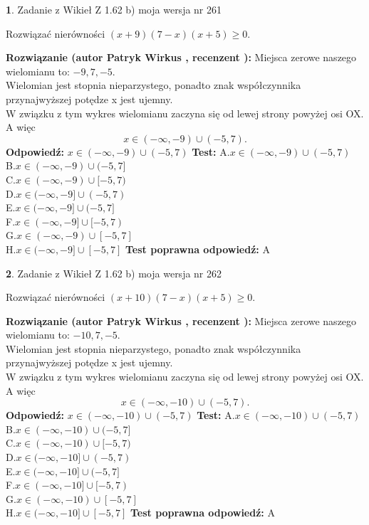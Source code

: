 \documentclass[12pt, a4paper]{article}
\theoremstyle{definition} %
\newtheorem{zad}{}
\newcommand{\zadStart}[1]{\begin{zad}#1\newline}
\newcommand{\zadStop}{\end{zad}}
\newcommand{\rozwStart}[2]{\noindent \textbf{Rozwiązanie (autor #1 , recenzent #2): }\newline}
\newcommand{\rozwStop}{\newline}
\newcommand{\odpStart}{\noindent \textbf{Odpowiedź:}\newline}
\newcommand{\odpStop}{\newline}
\newcommand{\testStart}{\noindent \textbf{Test:}\newline}
\newcommand{\testStop}{\newline}
\newcommand{\kluczStart}{\noindent \textbf{Test poprawna odpowiedź:}\newline}
\newcommand{\kluczStop}{\newline}
\begin{document}
\zadStart{Zadanie z Wikieł Z 1.62 b) moja wersja nr 261}

Rozwiązać nierówności $(x+9)(7-x)(x+5)\ge0$.
\zadStop
\rozwStart{Patryk Wirkus}{}
Miejsca zerowe naszego wielomianu to: $-9, 7, -5$.\\
Wielomian jest stopnia nieparzystego, ponadto znak współczynnika przy\linebreak najwyższej potędze x jest ujemny.\\ W związku z tym wykres wielomianu zaczyna się od lewej strony powyżej osi OX. A więc $$x \in (-\infty,-9) \cup (-5,7).$$
\rozwStop
\odpStart
$x \in (-\infty,-9) \cup (-5,7)$
\odpStop
\testStart
A.$x \in (-\infty,-9) \cup (-5,7)$\\
B.$x \in (-\infty,-9) \cup (-5,7]$\\
C.$x \in (-\infty,-9) \cup [-5,7)$\\
D.$x \in (-\infty,-9] \cup (-5,7)$\\
E.$x \in (-\infty,-9] \cup (-5,7]$\\
F.$x \in (-\infty,-9] \cup [-5,7)$\\
G.$x \in (-\infty,-9) \cup [-5,7]$\\
H.$x \in (-\infty,-9] \cup [-5,7]$
\testStop
\kluczStart
A
\kluczStop



\zadStart{Zadanie z Wikieł Z 1.62 b) moja wersja nr 262}

Rozwiązać nierówności $(x+10)(7-x)(x+5)\ge0$.
\zadStop
\rozwStart{Patryk Wirkus}{}
Miejsca zerowe naszego wielomianu to: $-10, 7, -5$.\\
Wielomian jest stopnia nieparzystego, ponadto znak współczynnika przy\linebreak najwyższej potędze x jest ujemny.\\ W związku z tym wykres wielomianu zaczyna się od lewej strony powyżej osi OX. A więc $$x \in (-\infty,-10) \cup (-5,7).$$
\rozwStop
\odpStart
$x \in (-\infty,-10) \cup (-5,7)$
\odpStop
\testStart
A.$x \in (-\infty,-10) \cup (-5,7)$\\
B.$x \in (-\infty,-10) \cup (-5,7]$\\
C.$x \in (-\infty,-10) \cup [-5,7)$\\
D.$x \in (-\infty,-10] \cup (-5,7)$\\
E.$x \in (-\infty,-10] \cup (-5,7]$\\
F.$x \in (-\infty,-10] \cup [-5,7)$\\
G.$x \in (-\infty,-10) \cup [-5,7]$\\
H.$x \in (-\infty,-10] \cup [-5,7]$
\testStop
\kluczStart
A
\kluczStop
\end{document}
